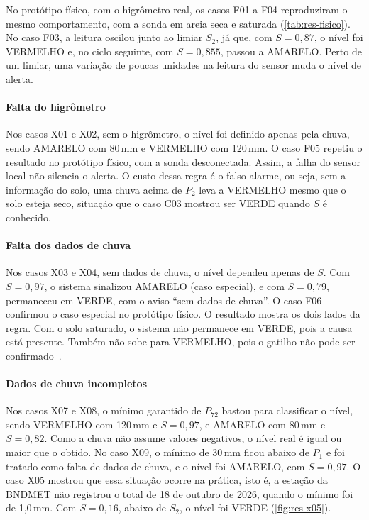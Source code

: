 No protótipo físico, com o higrômetro real, os casos F01 a F04
reproduziram o mesmo comportamento, com a sonda em areia seca e
saturada (\autoref{tab:res-fisico}). No caso F03, a leitura oscilou
junto ao limiar $S_2$, já que, com $S = 0{,}87$, o nível foi VERMELHO e, no
ciclo seguinte, com $S = 0{,}855$, passou a AMARELO. Perto de um limiar,
uma variação de poucas unidades na leitura do sensor muda o nível de
alerta.

\paragraph*{Falta do higrômetro}

Nos casos X01 e X02, sem o higrômetro, o nível foi definido apenas pela chuva, sendo AMARELO com 80\,mm e VERMELHO com 120\,mm. O caso F05 repetiu o
resultado no protótipo físico, com a sonda desconectada. Assim, a falha
do sensor local não silencia o alerta.
O custo dessa regra é o falso alarme, ou seja, sem a informação do solo, uma chuva
acima de $P_2$ leva a VERMELHO mesmo que o solo esteja seco, situação que
o caso C03 mostrou ser VERDE quando $S$ é conhecido.

\paragraph*{Falta dos dados de chuva}

Nos casos X03 e X04, sem dados de chuva, o nível dependeu apenas de $S$.
Com $S = 0{,}97$, o sistema sinalizou AMARELO (caso especial), e com
$S = 0{,}79$, permaneceu em VERDE, com o aviso ``sem dados de chuva''.
O caso F06 confirmou o caso especial no protótipo físico.
O resultado mostra os dois lados da regra. Com o solo saturado, o
sistema não permanece em VERDE, pois a causa está presente. Também não
sobe para VERMELHO, pois o gatilho não pode ser confirmado~\cite{bogaard2018hydrological}.

\paragraph*{Dados de chuva incompletos}

Nos casos X07 e X08, o mínimo garantido de $P_{72}$ bastou para
classificar o nível, sendo VERMELHO com 120\,mm e $S = 0{,}97$, e AMARELO com
80\,mm e $S = 0{,}82$. Como a chuva não assume valores negativos, o
nível real é igual ou maior que o obtido.
No caso X09, o mínimo de 30\,mm ficou abaixo de $P_1$ e foi tratado como
falta de dados de chuva, e o nível foi AMARELO, com $S = 0{,}97$. O caso
X05 mostrou que essa situação ocorre na prática, isto é, a estação da BNDMET
não registrou o total de 18 de outubro de 2026, quando o mínimo foi de 1,0\,mm. Com $S = 0{,}16$, abaixo de $S_2$, o nível foi VERDE
(\autoref{fig:res-x05}).

